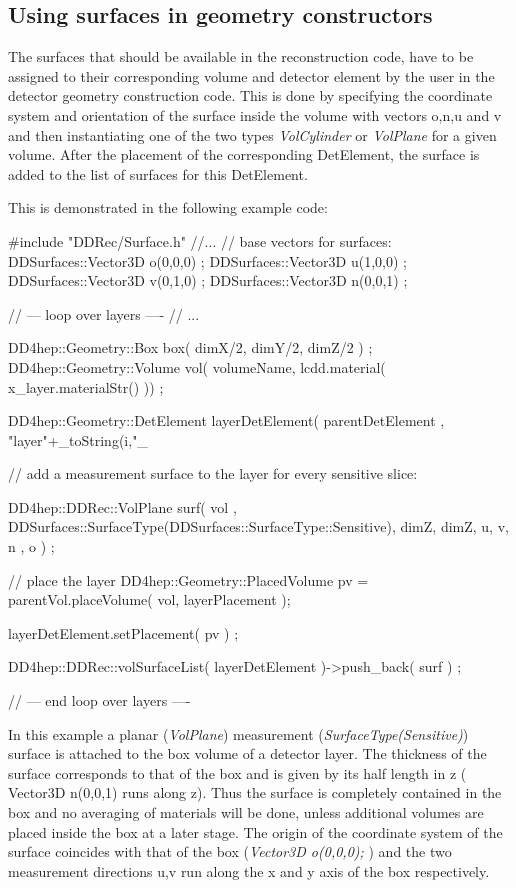 \documentclass[10pt,a4paper]{article}
\begin{document}
\subsection{Using surfaces in geometry constructors}
\label{subsec:ddrec-surfaces-constructors}
The surfaces that should be available in the reconstruction code, 
have to be assigned to their corresponding volume and detector element by the 
user in the detector geometry construction code. 
This is done by specifying the coordinate system
and orientation of the surface inside the volume with vectors o,n,u and v 
and then instantiating one of the two types {\em VolCylinder} or {\em VolPlane} for a 
given volume.
After the placement of the corresponding DetElement, the surface is added to the
list of surfaces for this DetElement.

\noindent
This is demonstrated in the  following example code:

\begin{code}
  #include "DDRec/Surface.h"
  //...
  // base vectors for surfaces:
  DDSurfaces::Vector3D o(0,0,0) ;
  DDSurfaces::Vector3D u(1,0,0) ;
  DDSurfaces::Vector3D v(0,1,0) ;
  DDSurfaces::Vector3D n(0,0,1) ;

  // --- loop over layers ----
  // ...

    DD4hep::Geometry::Box  box( dimX/2, dimY/2, dimZ/2 ) ;
    DD4hep::Geometry::Volume vol( volumeName, lcdd.material( x_layer.materialStr() )) ;

    DD4hep::Geometry::DetElement layerDetElement( parentDetElement , "layer"+_toString(i,"_%

    // add a measurement surface to the layer for every sensitive slice:

    DD4hep::DDRec::VolPlane surf( vol , 
                          DDSurfaces::SurfaceType(DDSurfaces::SurfaceType::Sensitive),
                          dimZ, dimZ, 
                          u, v, n , o ) ; 

    // place the layer
    DD4hep::Geometry::PlacedVolume pv = parentVol.placeVolume(  vol, layerPlacement );

    layerDetElement.setPlacement( pv ) ;

    DD4hep::DDRec::volSurfaceList( layerDetElement )->push_back( surf ) ;

  // --- end loop over layers ----

\end{code}
In this example a planar ({\em VolPlane}) measurement ({\em SurfaceType(Sensitive)})
surface is attached to the box volume of a detector layer.
The thickness of the surface corresponds to that of the box and is given by its half length in z
( Vector3D n(0,0,1) runs along z). Thus the surface is completely contained in 
the box and no averaging of materials will be done, unless additional volumes
are placed inside the box at a later stage. 
The origin of the coordinate system of the surface coincides with that of the box
({\em Vector3D o(0,0,0); })
and the two measurement directions u,v run along the x and y axis of the box
respectively.
\end{document}
